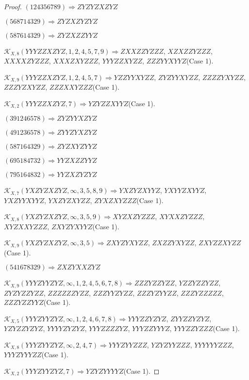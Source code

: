 \documentclass[12pt]{article}
\theoremstyle{plain}
\theoremstyle{definition}
\theoremstyle{remark}
\newcommand{\fancy}[1]{\mathcal{#1}}
\def\K{\fancy{K}}
\begin{document}
\begin{proof}
	
	
	$(1 2 4 3 5 6 7 8 9)\Rightarrow ZYZYZXZYZ$
	
	$(5 6 8 7 1 4 3 2 9)\Rightarrow ZYZXZYZYZ$
	
	$(5 8 7 6 1 4 3 2 9)\Rightarrow ZYZXZZYYZ$
	
	
	
	$\K_{X,8}(YYYZZXZYZ,1, 2, 4, 5, 7, 9)\Rightarrow $$ZXXZZYZZZ$, $XZXZZYZZZ$, $XXXXZYZZZ$, $XXXZXYZZZ$, $YYYZZXYZZ$, $ZZZYYXYYZ$(Case 1).
	
	$\K_{X,9}(YYYZZXZYZ,1, 2, 4, 5, 7)\Rightarrow $$YZZYYXYZZ$, $ZYZYYXYZZ$, $ZZZZYXYZZ$, $ZZZYZXYZZ$, $ZZZXXYZZZ$(Case 1).
	
	$\K_{X,2}(YYYZZXZYZ,7)\Rightarrow $$YZYZZXYYZ$(Case 1).
	
	
	
	$(3 9 1 2 4 6 5 7 8)\Rightarrow ZYZYYXZYZ$
	
	$(4 9 1 2 3 6 5 7 8)\Rightarrow ZYYZYXZYZ$
	
	$(5 8 7 1 6 4 3 2 9)\Rightarrow ZYZXYZYYZ$
	
	$(6 9 5 1 8 4 7 3 2)\Rightarrow YYZXZZYYZ$
	
	$(7 9 5 1 6 4 8 3 2)\Rightarrow YYZXZYZYZ$
	
	
	
	$\K_{X,7}(YXZYZXZYZ,\infty,3, 5, 8, 9)\Rightarrow $$YXZYZXYYZ$, $YXYYZXYYZ$, $YXZYYXYYZ$, $YXZYZXYZZ$, $ZYXZXYZZZ$(Case 1).
	
	$\K_{X,8}(YXZYZXZYZ,\infty,3, 5, 9)\Rightarrow $$XYZXZYZZZ$, $XYXXZYZZZ$, $XYZXXYZZZ$, $ZXYZYXYYZ$(Case 1).
	
	$\K_{X,9}(YXZYZXZYZ,\infty,3, 5)\Rightarrow $$ZXYZYXYZZ$, $ZXZZYXYZZ$, $ZXYZZXYZZ$(Case 1).
	
	
	
	$(5 4 1 6 7 8 3 2 9)\Rightarrow ZXZYXXZYZ$
	
	
	
	$\K_{X,9}(YYYZYYZYZ,\infty,1, 2, 4, 5, 6, 7, 8)\Rightarrow $$ZZZYZZYZZ$, $YZZYZZYZZ$, $ZYZYZZYZZ$, $ZZZZZZYZZ$, $ZZZYYZYZZ$, $ZZZYZYYZZ$, $ZZZYZZZZZ$, $ZZZYZZYYZ$(Case 1).
	
	$\K_{X,5}(YYYZYYZYZ,\infty,1, 2, 4, 6, 7, 8)\Rightarrow $$YYYZZYZYZ$, $ZYYZZYZYZ$, $YZYZZYZYZ$, $YYYYZYZYZ$, $YYYZZZZYZ$, $YYYZZYYYZ$, $YYYZZYZZZ$(Case 1).
	
	$\K_{X,8}(YYYZYYZYZ,\infty,2, 4, 7)\Rightarrow $$YYYZYYZZZ$, $YZYZYYZZZ$, $YYYYYYZZZ$, $YYYZYYYZZ$(Case 1).
	
	$\K_{X,2}(YYYZYYZYZ,7)\Rightarrow $$YZYZYYYYZ$(Case 1).
	
	
	

\end{proof}
\end{document}
